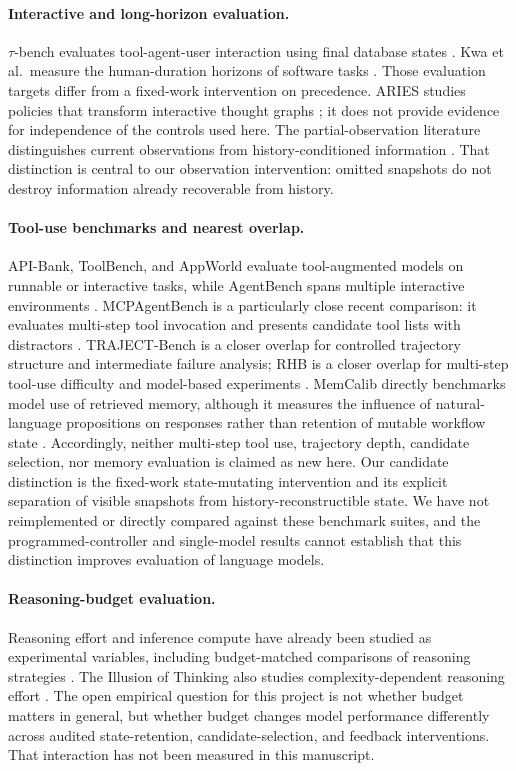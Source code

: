 \documentclass[sigconf,nonacm]{acmart}
\begin{document}
\paragraph{Interactive and long-horizon evaluation.}
$\tau$-bench evaluates tool-agent-user interaction using final database states
\cite{tau}. Kwa et al.\ measure the human-duration horizons of software tasks
\cite{metr}. Those evaluation targets differ from a fixed-work intervention
on precedence. ARIES studies policies that transform interactive thought
graphs \cite{aries}; it does not provide evidence for independence of the
controls used here. The partial-observation literature distinguishes
current observations from history-conditioned information \cite{pomdp}.
That distinction is central to our observation intervention: omitted
snapshots do not destroy information already recoverable from history.

\paragraph{Tool-use benchmarks and nearest overlap.}
API-Bank, ToolBench, and AppWorld evaluate tool-augmented models on runnable
or interactive tasks, while AgentBench spans multiple interactive
environments \cite{apibank,toolbench,appworld,agentbench}. MCPAgentBench is a
particularly close recent comparison: it evaluates multi-step tool invocation
and presents candidate tool lists with distractors \cite{mcpagentbench}.
TRAJECT-Bench is a closer overlap for controlled trajectory structure and
intermediate failure analysis; RHB is a closer overlap for multi-step
tool-use difficulty and model-based experiments \cite{traject,rhb}.
MemCalib directly benchmarks model use of retrieved memory, although it
measures the influence of natural-language propositions on responses rather
than retention of mutable workflow state \cite{memcalib}. Accordingly,
neither multi-step tool use, trajectory depth, candidate selection, nor
memory evaluation is claimed as new here. Our candidate distinction is the
fixed-work state-mutating intervention and its explicit separation of
visible snapshots from history-reconstructible state. We have not
reimplemented or directly compared against these benchmark suites, and the
programmed-controller and single-model results cannot establish that this
distinction improves evaluation of language models.

\paragraph{Reasoning-budget evaluation.}
Reasoning effort and inference compute have already been studied as
experimental variables, including budget-matched comparisons of reasoning
strategies \cite{tokenbudget}. The Illusion of Thinking also studies
complexity-dependent reasoning effort \cite{illusion}. The open empirical
question for this project is not whether budget matters in general, but
whether budget changes model performance differently across audited
state-retention, candidate-selection, and feedback interventions. That
interaction has not been measured in this manuscript.
\end{document}
